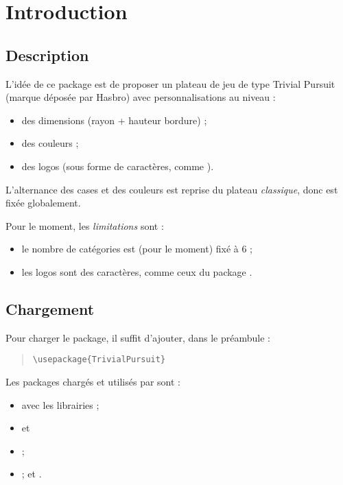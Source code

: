 \documentclass[11pt,a4paper]{ltxdoc}
\begin{document}
\section{Introduction}

\subsection{Description}

L'idée de ce package est de proposer un plateau de jeu de type \textsf{Trivial Pursuit} (marque déposée par Hasbro) avec personnalisations au niveau :

\begin{itemize}
	\item des dimensions (rayon + hauteur bordure) ;
	\item des couleurs ;
	\item des logos (sous forme de caractères, comme ).
\end{itemize}

L'alternance des cases et des couleurs est reprise du plateau \textit{classique}, donc est fixée globalement.

\medskip

Pour le moment, les \textit{limitations} sont :

\begin{itemize}
	\item le nombre de catégories est (pour le moment) fixé à 6 ;
	\item les logos sont des caractères, comme ceux du package .
\end{itemize}

\subsection{Chargement}

Pour charger le package, il suffit d'ajouter, dans le préambule :

\begin{quote}
\begin{verbatim}
\usepackage{TrivialPursuit}
\end{verbatim}
\end{quote}

Les packages chargés et utilisés par  sont :

\begin{itemize}
	\item {} avec les librairies  ;
	\item {} et \item {} ;
	\item {} ;  et .
\end{itemize}
\end{document}
